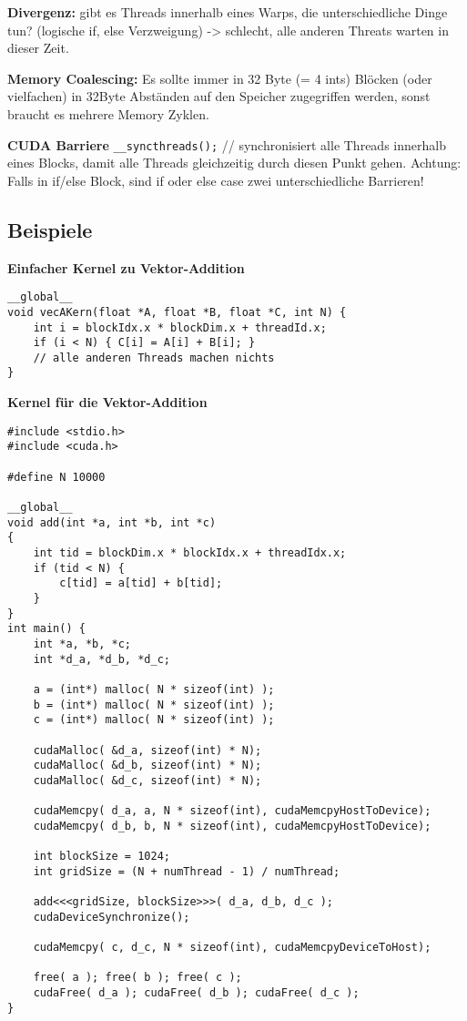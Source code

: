 \textbf{Divergenz:} gibt es Threads innerhalb eines Warps, die unterschiedliche Dinge tun? (logische if, else Verzweigung) -> schlecht, alle anderen Threats warten in dieser Zeit.

\textbf{Memory Coalescing:} Es sollte immer in 32 Byte (= 4 ints) Blöcken (oder vielfachen) in 32Byte Abständen auf den Speicher zugegriffen werden, sonst braucht es mehrere Memory Zyklen.  

\textbf{CUDA Barriere} \lstinline|__syncthreads();|  // synchronisiert alle Threads innerhalb eines Blocks, damit alle Threads gleichzeitig durch diesen Punkt gehen. Achtung: Falls in if/else Block, sind if oder else case zwei unterschiedliche Barrieren!

\subsection{Beispiele}
\textbf{Einfacher Kernel zu Vektor-Addition}
\begin{lstlisting}[style=csharp]
__global__
void vecAKern(float *A, float *B, float *C, int N) {
	int i = blockIdx.x * blockDim.x + threadId.x;
	if (i < N) { C[i] = A[i] + B[i]; }
	// alle anderen Threads machen nichts
}
\end{lstlisting}  

\textbf{Kernel für die Vektor-Addition}
\begin{lstlisting}[style=csharp]
#include <stdio.h>
#include <cuda.h>

#define N 10000

__global__ 
void add(int *a, int *b, int *c)
{
    int tid = blockDim.x * blockIdx.x + threadIdx.x;
    if (tid < N) {
        c[tid] = a[tid] + b[tid];
    }
}
int main() {
    int *a, *b, *c;
    int *d_a, *d_b, *d_c;

    a = (int*) malloc( N * sizeof(int) );
    b = (int*) malloc( N * sizeof(int) );
    c = (int*) malloc( N * sizeof(int) );

    cudaMalloc( &d_a, sizeof(int) * N);
    cudaMalloc( &d_b, sizeof(int) * N);
    cudaMalloc( &d_c, sizeof(int) * N);

    cudaMemcpy( d_a, a, N * sizeof(int), cudaMemcpyHostToDevice);
    cudaMemcpy( d_b, b, N * sizeof(int), cudaMemcpyHostToDevice);

    int blockSize = 1024;
    int gridSize = (N + numThread - 1) / numThread;

    add<<<gridSize, blockSize>>>( d_a, d_b, d_c );
    cudaDeviceSynchronize();

    cudaMemcpy( c, d_c, N * sizeof(int), cudaMemcpyDeviceToHost);
   
    free( a ); free( b ); free( c );
    cudaFree( d_a ); cudaFree( d_b ); cudaFree( d_c );   
}
\end{lstlisting}

